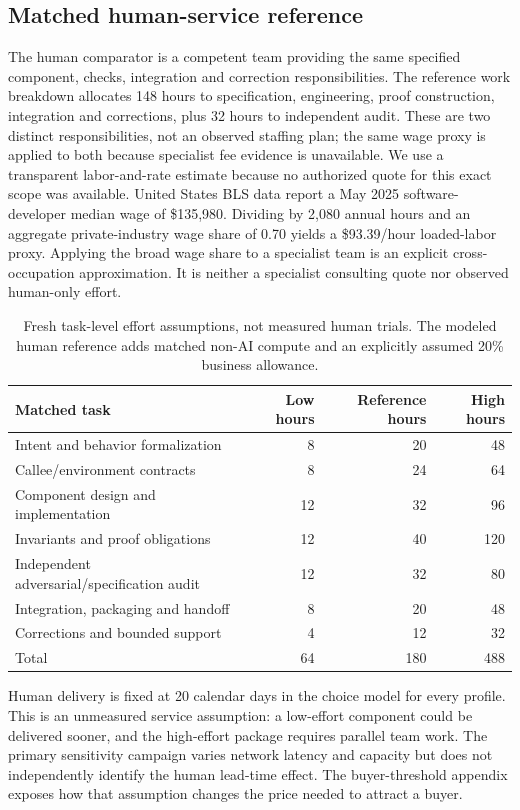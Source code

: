 \documentclass[11pt,letterpaper]{article}
\newcommand{\usd}[1]{\$#1}
\begin{document}
\subsection{Matched human-service reference}

The human comparator is a competent team providing the same specified component, checks, integration and correction responsibilities. The reference work breakdown allocates 148 hours to specification, engineering, proof construction, integration and corrections, plus 32 hours to independent audit. These are two distinct responsibilities, not an observed staffing plan; the same wage proxy is applied to both because specialist fee evidence is unavailable. We use a transparent labor-and-rate estimate because no authorized quote for this exact scope was available. United States BLS data report a May 2025 software-developer median wage of \usd{135,980}. Dividing by 2,080 annual hours and an aggregate private-industry wage share of 0.70 yields a \usd{93.39}/hour loaded-labor proxy. Applying the broad wage share to a specialist team is an explicit cross-occupation approximation. It is neither a specialist consulting quote nor observed human-only effort.\cite{blswage,blsecec}

\begin{table}[ht]\centering\small
\begin{tabular}{lrrr}\toprule
Matched task & Low hours & Reference hours & High hours\\\midrule
Intent and behavior formalization & 8 & 20 & 48\\
Callee/environment contracts & 8 & 24 & 64\\
Component design and implementation & 12 & 32 & 96\\
Invariants and proof obligations & 12 & 40 & 120\\
Independent adversarial/specification audit & 12 & 32 & 80\\
Integration, packaging and handoff & 8 & 20 & 48\\
Corrections and bounded support & 4 & 12 & 32\\\midrule
Total & 64 & 180 & 488\\\bottomrule
\end{tabular}
\caption{Fresh task-level effort assumptions, not measured human trials. The modeled human reference adds matched non-AI compute and an explicitly assumed 20\% business allowance.}
\end{table}

Human delivery is fixed at 20 calendar days in the choice model for every profile. This is an unmeasured service assumption: a low-effort component could be delivered sooner, and the high-effort package requires parallel team work. The primary sensitivity campaign varies network latency and capacity but does not independently identify the human lead-time effect. The buyer-threshold appendix exposes how that assumption changes the price needed to attract a buyer.
\end{document}
